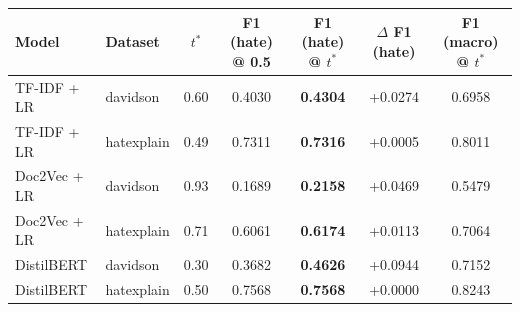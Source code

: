 \begin{tabular}{llccccc}
\toprule
Model & Dataset & $t^*$ & F1 (hate) @ 0.5 & F1 (hate) @ $t^*$ & $\Delta$ F1 (hate) & F1 (macro) @ $t^*$ \\
\midrule
TF-IDF + LR & davidson & 0.60 & 0.4030 & \textbf{0.4304} & +0.0274 & 0.6958 \\
TF-IDF + LR & hatexplain & 0.49 & 0.7311 & \textbf{0.7316} & +0.0005 & 0.8011 \\
Doc2Vec + LR & davidson & 0.93 & 0.1689 & \textbf{0.2158} & +0.0469 & 0.5479 \\
Doc2Vec + LR & hatexplain & 0.71 & 0.6061 & \textbf{0.6174} & +0.0113 & 0.7064 \\
DistilBERT & davidson & 0.30 & 0.3682 & \textbf{0.4626} & +0.0944 & 0.7152 \\
DistilBERT & hatexplain & 0.50 & 0.7568 & \textbf{0.7568} & +0.0000 & 0.8243 \\
\bottomrule
\end{tabular}

